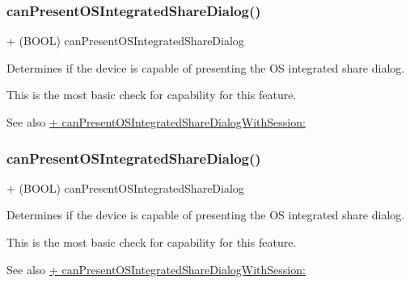 \subsubsection{\texorpdfstring{can\+Present\+O\+S\+Integrated\+Share\+Dialog()}{canPresentOSIntegratedShareDialog()}\hspace{0.1cm}{\footnotesize\ttfamily [3/5]}}
{\footnotesize\ttfamily + (B\+O\+OL) can\+Present\+O\+S\+Integrated\+Share\+Dialog \begin{DoxyParamCaption}{ }\end{DoxyParamCaption}}

Determines if the device is capable of presenting the OS integrated share dialog.

This is the most basic check for capability for this feature.

\begin{DoxySeeAlso}{See also}
\hyperlink{interfaceFBDialogs_a268b4ee8ee491e006770a51cefa36eeb}{+ can\+Present\+O\+S\+Integrated\+Share\+Dialog\+With\+Session\+:} 
\end{DoxySeeAlso}
\mbox{\label{interfaceFBDialogs_a4239a93d5d1b150b93cf589bca6f46e1}} 
\subsubsection{\texorpdfstring{can\+Present\+O\+S\+Integrated\+Share\+Dialog()}{canPresentOSIntegratedShareDialog()}\hspace{0.1cm}{\footnotesize\ttfamily [4/5]}}
{\footnotesize\ttfamily + (B\+O\+OL) can\+Present\+O\+S\+Integrated\+Share\+Dialog \begin{DoxyParamCaption}{ }\end{DoxyParamCaption}}

Determines if the device is capable of presenting the OS integrated share dialog.

This is the most basic check for capability for this feature.

\begin{DoxySeeAlso}{See also}
\hyperlink{interfaceFBDialogs_a268b4ee8ee491e006770a51cefa36eeb}{+ can\+Present\+O\+S\+Integrated\+Share\+Dialog\+With\+Session\+:} 
\end{DoxySeeAlso}
\mbox{\label{interfaceFBDialogs_a4239a93d5d1b150b93cf589bca6f46e1}} 
